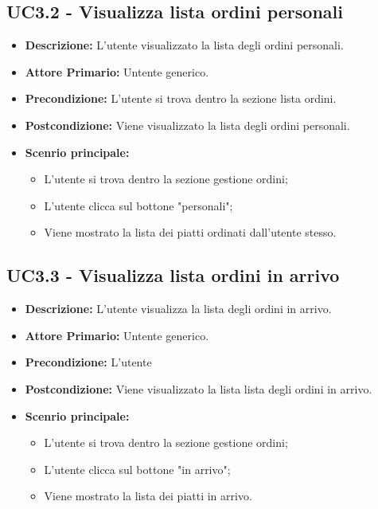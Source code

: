 \subsection{UC3.2 - Visualizza lista ordini personali}
\begin{itemize}
    \item \textbf{Descrizione:} L'utente visualizzato la lista degli ordini personali.
    \item \textbf{Attore Primario:} Untente generico.
    \item \textbf{Precondizione:} L'utente si trova dentro la sezione lista ordini.
    \item \textbf{Postcondizione:} Viene visualizzato la lista degli ordini personali.
    \item \textbf{Scenrio principale:}
    \begin{itemize}
        \item L'utente si trova dentro la sezione gestione ordini;
        \item L'utente clicca sul bottone "personali";
        \item Viene mostrato la lista dei piatti ordinati dall'utente stesso.
    \end{itemize}
\end{itemize}
\subsection{UC3.3 - Visualizza lista ordini in arrivo}
\begin{itemize}
    \item \textbf{Descrizione:} L'utente visualizza la lista degli ordini in arrivo.
    \item \textbf{Attore Primario:} Untente generico.
    \item \textbf{Precondizione:} L'utente 
    \item \textbf{Postcondizione:} Viene visualizzato la lista lista degli ordini in arrivo.
    \item \textbf{Scenrio principale:}
    \begin{itemize}
        \item L'utente si trova dentro la sezione gestione ordini;
        \item L'utente clicca sul bottone "in arrivo";
        \item Viene mostrato la lista dei piatti in arrivo.
    \end{itemize}
\end{itemize}
